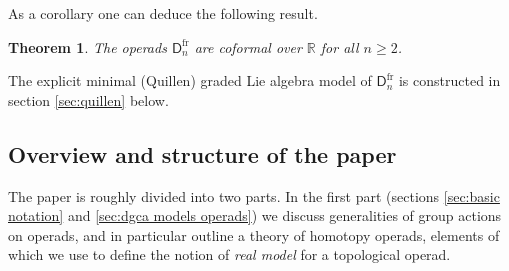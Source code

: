 \documentclass[a4paper]{amsart}
\theoremstyle{plain}
\newtheorem{thm}{Theorem}
\newtheorem{conj}[thm]{Conjecture}
\theoremstyle{definition}
\newcommand{\R}{{\mathbb{R}}}
\newcommand{\lD}{\mathsf{D}}
\newcommand{\flD}{\lD^{\mathrm{fr}}}
\begin{document}
As a corollary one can deduce the following result.

\begin{thm}\label{thm:FE3coformal}
The operads $\flD_n$ are coformal over $\R$ for all $n\geq 2$.
\end{thm}

The explicit minimal (Quillen) graded Lie algebra model of $\flD_n$ is constructed in section \ref{sec:quillen} below.





\subsection*{Overview and structure of the paper}
The paper is roughly divided into two parts. In the first part (sections \ref{sec:basic notation} and \ref{sec:dgca models operads}) we discuss generalities of group actions on operads, and in particular outline a theory of homotopy operads, elements of which we use to define the notion of \emph{real model} for a topological operad.
\end{document}
